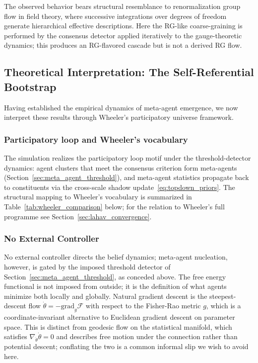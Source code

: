 \documentclass[11pt]{article}
\begin{document}
The observed behavior bears structural resemblance to renormalization group flow in field theory, where successive integrations over degrees of freedom generate hierarchical effective descriptions. Here the RG-like coarse-graining is performed by the consensus detector applied iteratively to the gauge-theoretic dynamics; this produces an RG-flavored cascade but is not a derived RG flow.

\subsection{Theoretical Interpretation: The Self-Referential Bootstrap}

Having established the empirical dynamics of meta-agent emergence, we now interpret these results through Wheeler's participatory universe framework.

\subsubsection{Participatory loop and Wheeler's vocabulary}

The simulation realizes the participatory loop motif under the threshold-detector dynamics: agent clusters that meet the consensus criterion form meta-agents (Section~\ref{sec:meta_agent_threshold}), and meta-agent statistics propagate back to constituents via the cross-scale shadow update~\eqref{eq:topdown_priors}. The structural mapping to Wheeler's vocabulary is summarized in Table~\ref{tab:wheeler_comparison} below; for the relation to Wheeler's full programme see Section~\ref{sec:lahav_convergence}.

\subsubsection{No External Controller}

No external controller directs the belief dynamics; meta-agent nucleation, however, is gated by the imposed threshold detector of Section~\ref{sec:meta_agent_threshold}, as conceded above. The free energy functional is not imposed from outside; it is the definition of what agents minimize both locally and globally. Natural gradient descent is the steepest-descent flow $\dot\theta = -\mathrm{grad}_g \mathcal{F}$ with respect to the Fisher-Rao metric $g$, which is a coordinate-invariant alternative to Euclidean gradient descent on parameter space. This is distinct from geodesic flow on the statistical manifold, which satisfies $\nabla_{\dot\theta}\dot\theta = 0$ and describes free motion under the connection rather than potential descent; conflating the two is a common informal slip we wish to avoid here.
\end{document}
